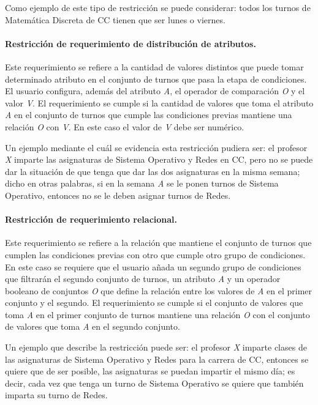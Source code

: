 Como ejemplo de este tipo de restricción se puede considerar: todos los turnos de Matemática Discreta de CC tienen que ser lunes o viernes.

\paragraph{Restricción de requerimiento de distribución de atributos.} Este requerimiento se refiere a la cantidad de valores distintos que puede tomar determinado atributo en el conjunto de turnos que pasa la etapa de condiciones. El usuario configura, además del atributo \textit{A}, el operador de comparación \textit{O} y el valor \textit{V}. El requerimiento se cumple si la cantidad de valores que toma el atributo \textit{A} en el conjunto de turnos que cumple las condiciones previas mantiene una relación \textit{O} con  \textit{V}. En este caso el valor de \textit{V} debe ser numérico.

Un ejemplo mediante el cuál se evidencia esta restricción pudiera ser: el profesor \textit{X} imparte las asignaturas de Sistema Operativo y Redes en CC, pero no se puede dar la situación de que tenga que dar las dos asignaturas en la misma semana; dicho en otras palabras, si en la semana \textit{A} se le ponen turnos de Sistema Operativo, entonces no se le deben asignar turnos de Redes.

\paragraph{Restricción de requerimiento relacional.} Este requerimiento se refiere a la relación que mantiene el conjunto de turnos que cumplen las condiciones previas con otro que cumple otro grupo de condiciones. En este caso se requiere que el usuario añada un segundo grupo de condiciones que filtrarán el segundo conjunto de turnos, un atributo \textit{A} y un operador booleano de conjuntos \textit{O} que define la relación entre los valores de \textit{A} en el primer conjunto y el segundo. El requerimiento se cumple si el conjunto de valores que toma \textit{A} en el primer conjunto de turnos mantiene una relación \textit{O} con el conjunto de valores que toma \textit{A} en el segundo conjunto.

Un ejemplo que describe la restricción puede ser: el profesor \textit{X} imparte clases de las asignaturas de Sistema Operativo y Redes para la carrera de CC, entonces se quiere que de ser posible, las asignaturas se puedan impartir el mismo día; es decir, cada vez que tenga un turno de Sistema Operativo se quiere que también imparta su turno de Redes.


